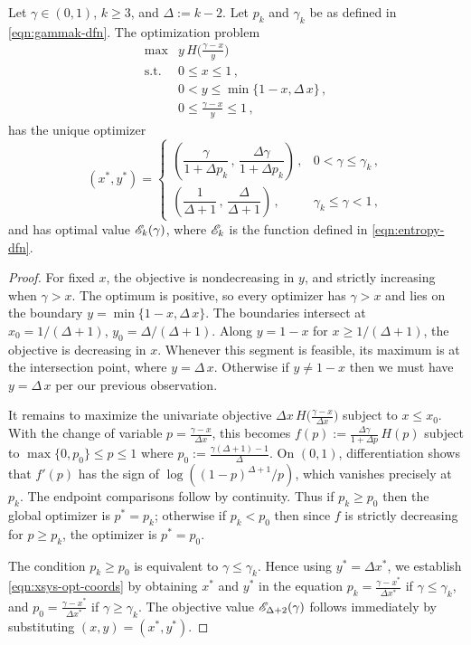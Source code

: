 \begin{lemma}\label{lemma:k1k-calc-prob}
Let $\gamma\in(0,1)$, $k\geq3$, and $\Delta:=k-2$. Let $p_k$ and $\gamma_k$ be as defined in \eqref{eqn:gammak-dfn}. The optimization problem
\begin{equation}\label{eqn:calculus-problem}
\begin{array}{ll}
\max & y\,H\big(\frac{\gamma-x}{y}\big) \\[6pt]
\mathrm{s.t.} & 0\leq x\leq 1 \,, \\[3pt]
& 0<y\leq\min\{1-x,\Delta\,x\} \,, \\[3pt]
& 0\leq \frac{\gamma-x}{y} \leq 1 \,,
\end{array}
\end{equation}
has the unique optimizer
\begin{equation}\label{eqn:xsys-opt-coords}
(x^\ast,y^\ast)=\begin{cases}
\left(\dfrac{\gamma}{1+\Delta p_k}\,,\,\dfrac{\Delta\gamma}{1+\Delta p_k}\right)\,, & 0<\gamma\leq \gamma_k\,,\\[10pt]
\left(\dfrac{1}{\Delta+1}\,,\,\dfrac{\Delta}{\Delta+1}\right)\,, & \gamma_k\leq \gamma<1\,,
\end{cases}
\end{equation}
and has optimal value ${\mathscr E}_k(\gamma)$, where ${\mathscr E}_k$ is the function defined in \eqref{eqn:entropy-dfn}.
\end{lemma}
\begin{proof}
For fixed $x$, the objective is nondecreasing in $y$, and strictly increasing when $\gamma>x$. The optimum is positive, so every optimizer has $\gamma>x$ and lies on the boundary $y=\min\{1-x,\Delta\,x\}$. The boundaries intersect at $x_0=1/(\Delta+1)$, $y_0=\Delta/(\Delta+1)$. Along $y=1-x$ for $x\geq1/(\Delta+1)$, the objective is decreasing in $x$. Whenever this segment is feasible, its maximum is at the intersection point, where $y=\Delta\,x$. Otherwise if $y\neq1-x$ then we must have $y=\Delta\,x$ per our previous observation.

It remains to maximize the univariate objective $\Delta x\,H\big(\frac{\gamma-x}{\Delta x}\big)$ subject to $x\leq x_0$. With the change of variable $p=\frac{\gamma-x}{\Delta x}$, this becomes $f(p):=\frac{\Delta\gamma}{1+\Delta p}\,H(p)$ subject to $\max\{0,p_0\}\leq p\leq1$ where $p_0:=\frac{\gamma(\Delta+1)-1}{\Delta}$. On $(0,1)$, differentiation shows that $f'(p)$ has the sign of $\log((1-p)^{\Delta+1}/p)$, which vanishes precisely at $p_k$. The endpoint comparisons follow by continuity. Thus if $p_k\geq p_0$ then the global optimizer is $p^\ast=p_k$; otherwise if $p_k<p_0$ then since $f$ is strictly decreasing for $p\geq p_k$, the optimizer is $p^\ast=p_0$.

The condition $p_k\geq p_0$ is equivalent to $\gamma\leq\gamma_k$. Hence using $y^\ast=\Delta x^\ast$, we establish \eqref{eqn:xsys-opt-coords} by obtaining $x^\ast$ and $y^\ast$ in the equation $p_k=\frac{\gamma-x^\ast}{\Delta x^\ast}$ if $\gamma\leq\gamma_k$, and $p_0=\frac{\gamma-x^\ast}{\Delta x^\ast}$ if $\gamma\geq\gamma_k$. The objective value ${\mathscr E}_{\Delta+2}(\gamma)$ follows immediately by substituting $(x,y)=(x^\ast,y^\ast)$.
\end{proof}

